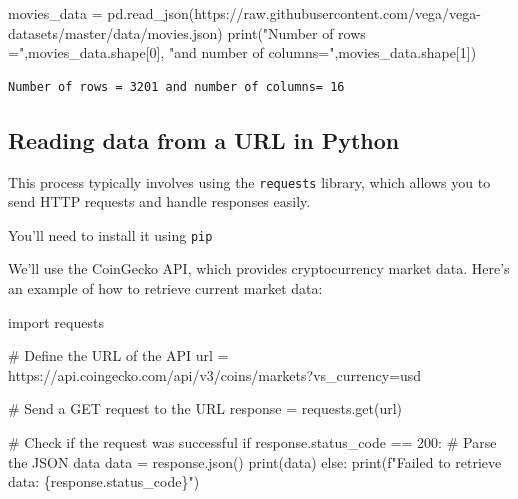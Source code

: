 \documentclass[
  letterpaper,
  DIV=11,
  numbers=noendperiod]{scrreprt}
\newenvironment{Shaded}{\begin{snugshade}}{\end{snugshade}}
\newcommand{\BuiltInTok}[1]{\textcolor[rgb]{0.00,0.23,0.31}{#1}}
\newcommand{\CommentTok}[1]{\textcolor[rgb]{0.37,0.37,0.37}{#1}}
\newcommand{\ControlFlowTok}[1]{\textcolor[rgb]{0.00,0.23,0.31}{#1}}
\newcommand{\DecValTok}[1]{\textcolor[rgb]{0.68,0.00,0.00}{#1}}
\newcommand{\ImportTok}[1]{\textcolor[rgb]{0.00,0.46,0.62}{#1}}
\newcommand{\NormalTok}[1]{\textcolor[rgb]{0.00,0.23,0.31}{#1}}
\newcommand{\OperatorTok}[1]{\textcolor[rgb]{0.37,0.37,0.37}{#1}}
\newcommand{\SpecialCharTok}[1]{\textcolor[rgb]{0.37,0.37,0.37}{#1}}
\newcommand{\SpecialStringTok}[1]{\textcolor[rgb]{0.13,0.47,0.30}{#1}}
\newcommand{\StringTok}[1]{\textcolor[rgb]{0.13,0.47,0.30}{#1}}
\begin{document}
\begin{Shaded}
\begin{Highlighting}[]
\NormalTok{movies\_data }\OperatorTok{=}\NormalTok{ pd.read\_json(}\StringTok{\textquotesingle{}https://raw.githubusercontent.com/vega/vega{-}datasets/master/data/movies.json\textquotesingle{}}\NormalTok{)}
\BuiltInTok{print}\NormalTok{(}\StringTok{"Number of rows ="}\NormalTok{,movies\_data.shape[}\DecValTok{0}\NormalTok{], }\StringTok{"and number of columns="}\NormalTok{,movies\_data.shape[}\DecValTok{1}\NormalTok{])}
\end{Highlighting}
\end{Shaded}

\begin{verbatim}
Number of rows = 3201 and number of columns= 16
\end{verbatim}

\hypertarget{reading-data-from-a-url-in-python}{%
\subsection{Reading data from a URL in
Python}\label{reading-data-from-a-url-in-python}}

This process typically involves using the \texttt{requests} library,
which allows you to send HTTP requests and handle responses easily.

You'll need to install it using \texttt{pip}

We'll use the CoinGecko API, which provides cryptocurrency market data.
Here's an example of how to retrieve current market data:

\begin{Shaded}
\begin{Highlighting}[]
\ImportTok{import}\NormalTok{ requests}

\CommentTok{\# Define the URL of the API}
\NormalTok{url }\OperatorTok{=} \StringTok{\textquotesingle{}https://api.coingecko.com/api/v3/coins/markets?vs\_currency=usd\textquotesingle{}}

\CommentTok{\# Send a GET request to the URL}
\NormalTok{response }\OperatorTok{=}\NormalTok{ requests.get(url)}

\CommentTok{\# Check if the request was successful}
\ControlFlowTok{if}\NormalTok{ response.status\_code }\OperatorTok{==} \DecValTok{200}\NormalTok{:}
    \CommentTok{\# Parse the JSON data}
\NormalTok{    data }\OperatorTok{=}\NormalTok{ response.json()}
    \BuiltInTok{print}\NormalTok{(data)}
\ControlFlowTok{else}\NormalTok{:}
    \BuiltInTok{print}\NormalTok{(}\SpecialStringTok{f"Failed to retrieve data: }\SpecialCharTok{\{}\NormalTok{response}\SpecialCharTok{.}\NormalTok{status\_code}\SpecialCharTok{\}}\SpecialStringTok{"}\NormalTok{)}
\end{Highlighting}
\end{Shaded}
\end{document}
